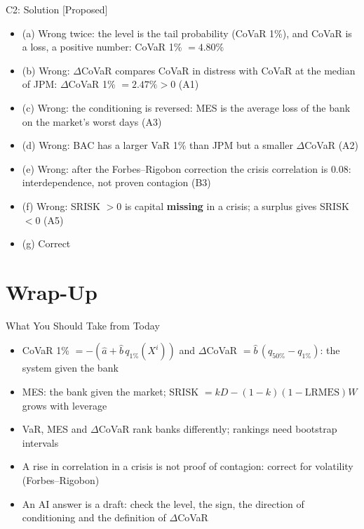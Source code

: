 \ifsolutions
\begin{frame}{C2: Solution [Proposed]}
\itemsize{\footnotesize}
\begin{itemize}
    \item (a) Wrong twice: the level is the tail probability (CoVaR 1\%), and CoVaR is a loss, a positive number: CoVaR 1\% $= 4.80\%$
    \item (b) Wrong: $\Delta$CoVaR compares CoVaR in distress with CoVaR at the median of JPM: $\Delta$CoVaR 1\% $= 2.47\% > 0$ (A1)
    \item (c) Wrong: the conditioning is reversed: MES is the average loss of the bank on the market's worst days (A3)
    \item (d) Wrong: BAC has a larger VaR 1\% than JPM but a smaller $\Delta$CoVaR (A2)
    \item (e) Wrong: after the Forbes--Rigobon correction the crisis correlation is $0.08$: interdependence, not proven contagion (B3)
    \item (f) Wrong: SRISK $> 0$ is capital \textbf{missing} in a crisis; a surplus gives SRISK $< 0$ (A5)
    \item (g) Correct
\end{itemize}
\end{frame}
\fi


\section{Wrap-Up}

\begin{frame}{What You Should Take from Today}
\itemsize{\small}
\begin{itemize}
    \item CoVaR 1\% $= -(\hat a + \hat b\,q_{1\%}(X^i))$ and $\Delta$CoVaR $= \hat b\,(q_{50\%} - q_{1\%})$: the system given the bank
    \item MES: the bank given the market; SRISK $= kD - (1 - k)(1 - \mathrm{LRMES})W$ grows with leverage
    \item VaR, MES and $\Delta$CoVaR rank banks differently; rankings need bootstrap intervals
    \item A rise in correlation in a crisis is not proof of contagion: correct for volatility (Forbes--Rigobon)
    \item An AI answer is a draft: check the level, the sign, the direction of conditioning and the definition of $\Delta$CoVaR
\end{itemize}
\end{frame}

